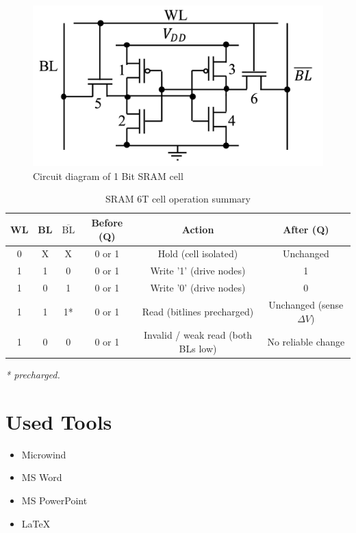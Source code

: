 \documentclass[12pt]{article}
\begin{document}
\begin{figure}[H]
  \centering
  \includegraphics[width=\textwidth]{c.png}
  \caption{Circuit diagram of 1 Bit SRAM cell}
\end{figure}

\begin{table}[H]
  \centering
  \begin{tabular}{|c|c|c|c|c|c|}
    \hline
    WL & BL & $\overline{\text{BL}}$ & Before (Q) & Action                             & After (Q)                    \\
    \hline
    0  & X  & X                      & 0 or 1     & Hold (cell isolated)               & Unchanged                    \\
    \hline
    1  & 1  & 0                      & 0 or 1     & Write '1' (drive nodes)            & 1                            \\
    \hline
    1  & 0  & 1                      & 0 or 1     & Write '0' (drive nodes)            & 0                            \\
    \hline
    1  & 1  & 1*                     & 0 or 1     & Read (bitlines precharged)         & Unchanged (sense $\Delta V$) \\
    \hline
    1  & 0  & 0                      & 0 or 1     & Invalid / weak read (both BLs low) & No reliable change           \\
    \hline
  \end{tabular}
  \begin{flushleft}
    \footnotesize\textit{* precharged.}
  \end{flushleft}
  \caption{SRAM 6T cell operation summary}
  \vspace{2pt}
\end{table}

\section*{Used Tools}
\begin{itemize}
  \item Microwind
  \item MS Word
  \item MS PowerPoint
  \item \LaTeX
\end{itemize}
\end{document}
